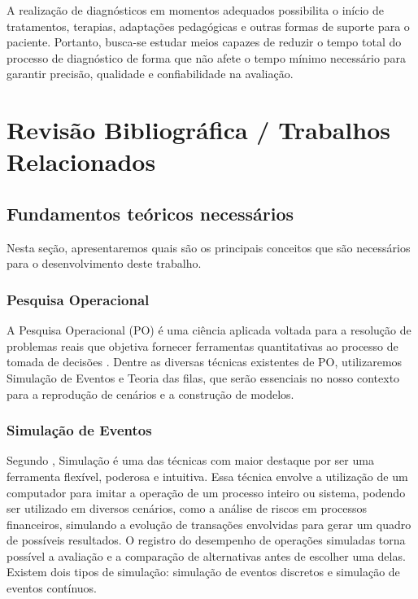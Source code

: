 \documentclass[
    12pt,
    openright,
    oneside,
    a4paper,
    english,
    brazil
]{abntex2}
\begin{document}
A realização de diagnósticos em momentos adequados possibilita o início de tratamentos, terapias, adaptações pedagógicas e outras formas de suporte para o paciente. Portanto, busca-se estudar meios capazes de reduzir o tempo total do processo de diagnóstico de forma que não afete o tempo mínimo necessário para garantir precisão, qualidade e confiabilidade na avaliação.

\chapter{Revisão Bibliográfica / Trabalhos Relacionados}

\section{Fundamentos teóricos necessários}


Nesta seção, apresentaremos quais são os principais conceitos que são necessários para o desenvolvimento deste trabalho.

\subsection{Pesquisa Operacional}
A Pesquisa Operacional (PO) é uma ciência aplicada voltada para a resolução de problemas reais que objetiva fornecer ferramentas quantitativas ao processo de tomada de decisões \cite{Rodriguez2009}. Dentre as diversas técnicas existentes de PO, utilizaremos Simulação de Eventos e Teoria das filas, que serão essenciais no nosso contexto para a reprodução de cenários e a construção de modelos.

\subsection{Simulação de Eventos}

Segundo , Simulação é uma das técnicas com maior destaque por ser uma ferramenta flexível, poderosa e intuitiva. Essa técnica envolve a utilização de um computador para imitar a operação de um processo inteiro ou sistema, podendo ser utilizado em diversos cenários, como a análise de riscos em processos financeiros, simulando a evolução de transações envolvidas para gerar um quadro de possíveis resultados. O registro do desempenho de operações simuladas torna possível  a avaliação e a comparação de alternativas antes de escolher uma delas. Existem dois tipos de simulação: simulação de eventos discretos e simulação de eventos contínuos.
\end{document}
